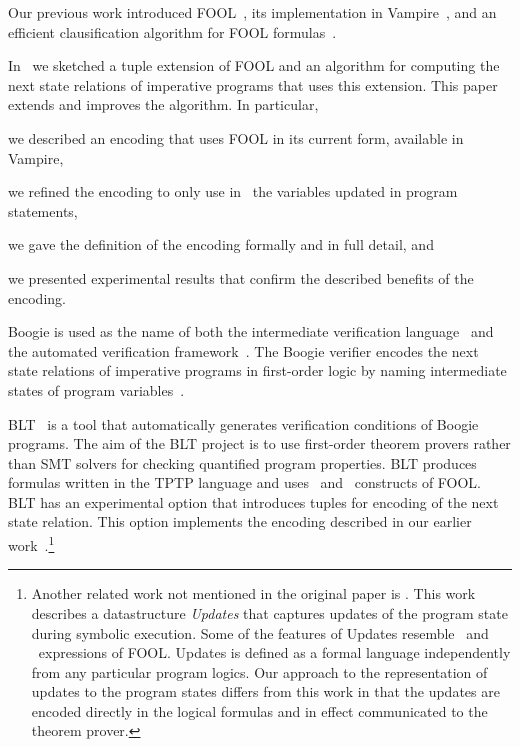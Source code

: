 
Our previous work introduced FOOL~\cite{FOOL}, its implementation in Vampire~\cite{VampireAndFOOL}, and an efficient clausification algorithm for FOOL formulas~\cite{FOOLCNF}.

In~\cite{VampireAndFOOL} we sketched a tuple extension of FOOL and an algorithm for computing the next state relations of imperative programs that uses this extension. This paper extends and improves the algorithm. In particular, \begin{enumerate*}[label=(\roman*)]\item we described an encoding that uses FOOL in its current form, available in Vampire, \item we refined the encoding to only use in \LETIN\ the variables updated in program statements, \item we gave the definition of the encoding formally and in full detail, and \item we presented experimental results that confirm the described benefits of the encoding.\end{enumerate*}

Boogie is used as the name of both the intermediate verification language~\cite{leino2008boogie} and the automated verification framework~\cite{DBLP:conf/fmco/BarnettCDJL05}. The Boogie verifier encodes the next state relations of imperative programs in first-order logic by naming intermediate states of program variables~\cite{DBLP:journals/ipl/Leino05}.

BLT~\cite{CF-iFM17} is a tool that automatically generates verification conditions of Boogie programs. The aim of the BLT project is to use first-order theorem provers rather than SMT solvers for checking quantified program properties. BLT produces formulas written in the TPTP language and uses \ITE\ and \LETIN\ constructs of FOOL. BLT has an experimental option that introduces tuples for encoding of the next state relation. This option implements the encoding described in our earlier work~\cite{VampireAndFOOL}.\footnote{Another related work not mentioned in the original paper is \cite{Rummer06}. This work describes a datastructure \emph{Updates} that captures updates of the program state during symbolic execution. Some of the features of Updates resemble \ITE\ and \LETIN\ expressions of FOOL. Updates is defined as a formal language independently from any particular program logics. Our approach to the representation of updates to the program states differs from this work in that the updates are encoded directly in the logical formulas and in effect communicated to the theorem prover.}